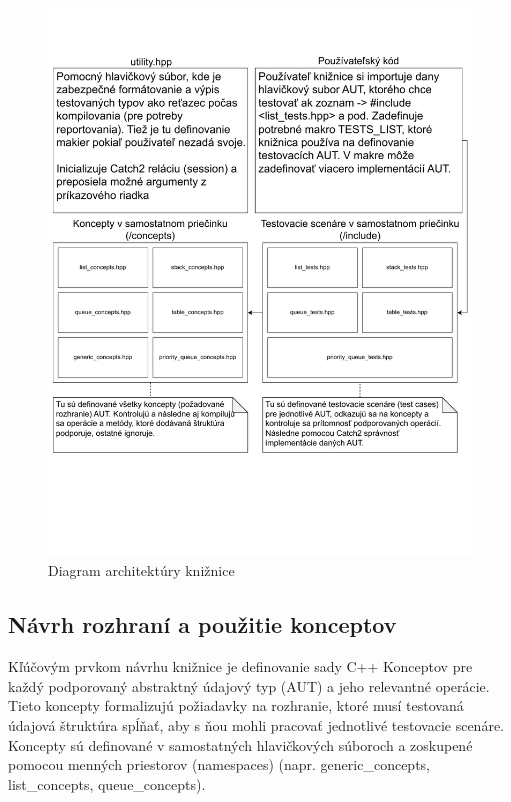 \documentclass[11pt]{article}
\begin{document}
\begin{figure}[H]
  \centerline{
    \includegraphics[width=\textwidth]{arch_diagram.pdf}
  }
  \caption{Diagram architektúry knižnice}
  \label{fig:arch_diagram}
\end{figure}

\subsection{Návrh rozhraní a použitie konceptov}

Kľúčovým prvkom návrhu knižnice je definovanie sady C++ Konceptov pre každý podporovaný abstraktný údajový typ (AUT) a jeho relevantné operácie. Tieto koncepty formalizujú požiadavky na rozhranie, ktoré musí testovaná údajová štruktúra spĺňať, aby s ňou mohli pracovať jednotlivé testovacie scenáre. Koncepty sú definované v samostatných hlavičkových súboroch a zoskupené pomocou menných priestorov (namespaces) (napr. generic\_concepts, list\_concepts, queue\_concepts).
\end{document}
